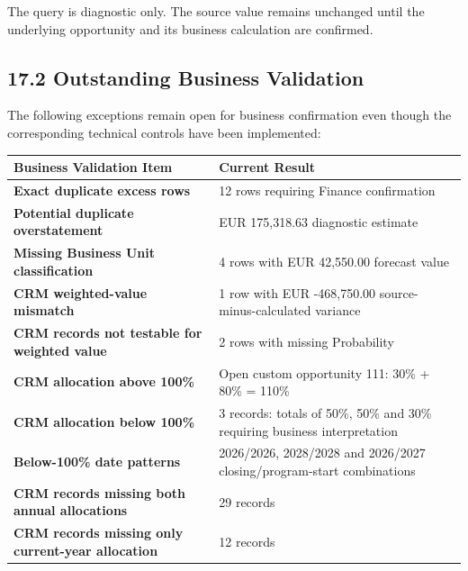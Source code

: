 \documentclass[11pt,a4paper]{article}
\begin{document}
The query is diagnostic only. The source value remains unchanged until the
underlying opportunity and its business calculation are confirmed.

\subsection{17.2 Outstanding Business Validation}

The following exceptions remain open for business confirmation even though the
corresponding technical controls have been implemented:

\begin{tabularx}{\textwidth}{
    >{\raggedright\arraybackslash\bfseries\color{AaltoNavy}}p{7cm}
    X
}

\toprule

Business Validation Item
&
Current Result
\\

\midrule

Exact duplicate excess rows
&
12 rows requiring Finance confirmation
\\

Potential duplicate overstatement
&
EUR 175,318.63 diagnostic estimate
\\

Missing Business Unit classification
&
4 rows with EUR 42,550.00 forecast value
\\

CRM weighted-value mismatch
&
1 row with EUR -468,750.00 source-minus-calculated variance
\\

CRM records not testable for weighted value
&
2 rows with missing Probability
\\

CRM allocation above 100\%
&
Open custom opportunity 111: 30\% + 80\% = 110\%
\\

CRM allocation below 100\%
&
3 records: totals of 50\%, 50\% and 30\% requiring business interpretation
\\

Below-100\% date patterns
&
2026/2026, 2028/2028 and 2026/2027 closing/program-start combinations
\\

CRM records missing both annual allocations
&
29 records
\\

CRM records missing only current-year allocation
&
12 records
\\


\end{tabularx}
\end{document}
